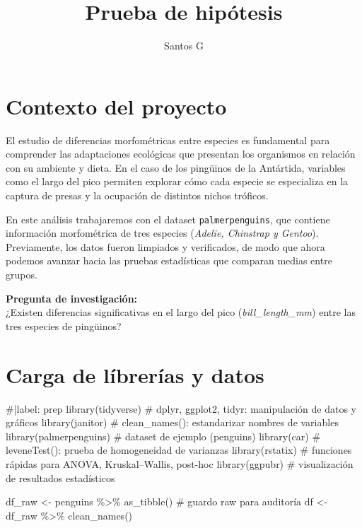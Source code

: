 \documentclass[
  spanish,
  11pt,
  a4paper,
  DIV=11,
  numbers=noendperiod]{scrartcl}
\title{Prueba de hipótesis}
\author{Santos G}
\date{}
\newenvironment{Shaded}{\begin{snugshade}}{\end{snugshade}}
\newcommand{\CommentTok}[1]{\textcolor[rgb]{0.37,0.37,0.37}{#1}}
\newcommand{\FunctionTok}[1]{\textcolor[rgb]{0.28,0.35,0.67}{#1}}
\newcommand{\NormalTok}[1]{\textcolor[rgb]{0.00,0.23,0.31}{#1}}
\newcommand{\OtherTok}[1]{\textcolor[rgb]{0.00,0.23,0.31}{#1}}
\newcommand{\SpecialCharTok}[1]{\textcolor[rgb]{0.37,0.37,0.37}{#1}}
\renewcommand*\contentsname{Tabla de contenidos}
\newcommand\contentsname{Tabla de contenidos}
\begin{document}
\maketitle

\renewcommand*\contentsname{Tabla de contenidos}
{
\hypersetup{linkcolor=}
\setcounter{tocdepth}{2}
\tableofcontents
}

\section{Contexto del proyecto}\label{contexto-del-proyecto}

El estudio de diferencias morfométricas entre especies es fundamental
para comprender las adaptaciones ecológicas que presentan los organismos
en relación con su ambiente y dieta. En el caso de los pingüinos de la
Antártida, variables como el largo del pico permiten explorar cómo cada
especie se especializa en la captura de presas y la ocupación de
distintos nichos tróficos.

En este análisis trabajaremos con el dataset \texttt{palmerpenguins},
que contiene información morfométrica de tres especies (\emph{Adelie,
Chinstrap y Gentoo}). Previamente, los datos fueron limpiados y
verificados, de modo que ahora podemos avanzar hacia las pruebas
estadísticas que comparan medias entre grupos.

\textbf{Pregunta de investigación:}\\
¿Existen diferencias significativas en el largo del pico
(\emph{bill\_length\_mm}) entre las tres especies de pingüinos?

\section{Carga de líbrerías y
datos}\label{carga-de-luxedbreruxedas-y-datos}

\begin{Shaded}
\begin{Highlighting}[numbers=left,,]
\CommentTok{\#|label: prep}
\FunctionTok{library}\NormalTok{(tidyverse)   }\CommentTok{\# dplyr, ggplot2, tidyr: manipulación de datos y gráficos}
\FunctionTok{library}\NormalTok{(janitor)     }\CommentTok{\# clean\_names(): estandarizar nombres de variables}
\FunctionTok{library}\NormalTok{(palmerpenguins) }\CommentTok{\# dataset de ejemplo (penguins)}
\FunctionTok{library}\NormalTok{(car)         }\CommentTok{\# leveneTest(): prueba de homogeneidad de varianzas}
\FunctionTok{library}\NormalTok{(rstatix)     }\CommentTok{\# funciones rápidas para ANOVA, Kruskal–Wallis, post{-}hoc}
\FunctionTok{library}\NormalTok{(ggpubr)      }\CommentTok{\# visualización de resultados estadísticos}

\NormalTok{df\_raw }\OtherTok{\textless{}{-}}\NormalTok{ penguins }\SpecialCharTok{\%\textgreater{}\%} \FunctionTok{as\_tibble}\NormalTok{() }\CommentTok{\# guardo raw para auditoría}
\NormalTok{df }\OtherTok{\textless{}{-}}\NormalTok{ df\_raw }\SpecialCharTok{\%\textgreater{}\%} \FunctionTok{clean\_names}\NormalTok{()}
\end{Highlighting}
\end{Shaded}
\end{document}

